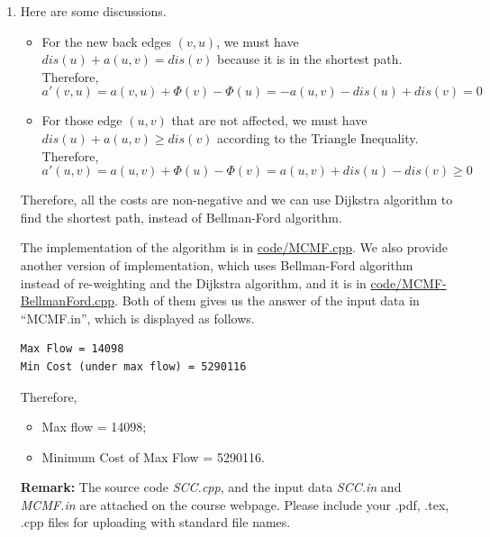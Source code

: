 \documentclass[12pt,a4paper]{article}
\makeatletter
\newtheorem*{solution}{Solution}
\theoremstyle{definition}
\renewenvironment{solution}[1][Solution] {\par\pushQED{\qed}\normalfont\topsep6\p@\@plus6\p@\relax\trivlist\item[\hskip\labelsep\bfseries#1\@addpunct{.}]\ignorespaces}{\popQED\endtrivlist\@endpefalse} \makeatother
\makeatother
\begin{document}
\begin{enumerate}
\begin{solution}
    Here are some discussions.
    \begin{itemize}
    \item For the new back edges $(v, u)$, we must have $dis(u) + a(u, v) = dis(v)$ because it is in the shortest path. Therefore,
    \begin{displaymath}
    a'(v, u) = a(v, u) + \Phi(v) - \Phi(u) = -a(u, v) - dis(u) + dis(v) = 0
    \end{displaymath}
    \item For those edge $(u, v)$ that are not affected, we must have $dis(u) + a(u,v) \geq dis(v)$ according to the Triangle Inequality. Therefore,
    \begin{displaymath}
    a'(u, v) = a(u, v) + \Phi(u) - \Phi(v) = a(u, v) + dis(u) - dis(v) \geq 0
    \end{displaymath}
    \end{itemize}

    Therefore, all the costs are non-negative and we can use Dijkstra algorithm to find the shortest path, instead of Bellman-Ford algorithm.

    The implementation of the algorithm is in \href{code/MCMF.cpp}{code/MCMF.cpp}. We also provide another version of implementation, which uses Bellman-Ford algorithm instead of re-weighting and the Dijkstra algorithm, and it is in \href{code/MCMF-BellmanFord.cpp}{code/MCMF-BellmanFord.cpp}. Both of them gives us the answer of the input data in ``MCMF.in'', which is displayed as follows.
    \begin{lstlisting}
Max Flow = 14098
Min Cost (under max flow) = 5290116
    \end{lstlisting}
    Therefore, 
    \begin{itemize}
    \item Max flow = 14098;
    \item Minimum Cost of Max Flow = 5290116.
    \end{itemize}
    \end{solution}


\textbf{Remark:} The source code \emph{SCC.cpp}, and the input data \emph{SCC.in} and \emph{MCMF.in} are attached on the course webpage. Please include your .pdf, .tex, .cpp files for uploading with standard file names.
\end{enumerate}






\end{document}
